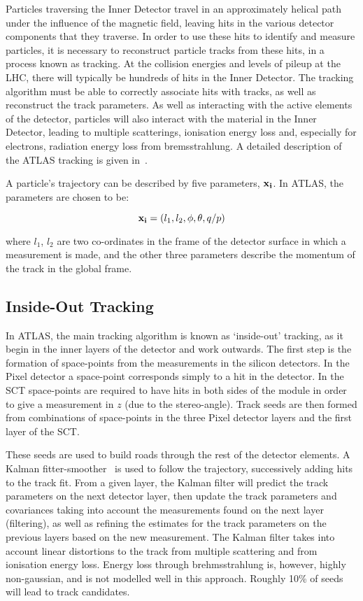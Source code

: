 Particles traversing the Inner Detector travel in an approximately helical path
under the influence of the magnetic field, leaving hits in the various detector
components that they traverse. In order to use these hits to identify and
measure particles, it is necessary to reconstruct particle tracks from these
hits, in a process known as tracking. At the collision energies and levels of
pileup at the LHC, there will typically be hundreds of hits in the Inner
Detector. The tracking algorithm must be able to correctly associate hits with
tracks, as well as reconstruct the track parameters. As well as interacting with
the active elements of the detector, particles will also interact with the
material in the Inner Detector, leading to multiple scatterings, ionisation
energy loss and, especially for electrons, radiation energy loss from
bremsstrahlung. A detailed description of the ATLAS tracking is given
in~\cite{1742-6596-119-3-032014}.

A particle's trajectory can be described by five parameters, $\bf{x_{i}}$. In
ATLAS, the parameters are chosen to be:

\begin{equation} {\bf x_{i}} = (l_{1}, l_{2}, \phi, \theta, q/p) \end{equation}

where $l_{1}$, $l_{2}$ are two co-ordinates in the frame of the detector surface
in which a measurement is made, and the other three parameters describe the momentum of the
track in the global frame.

\subsection{Inside-Out Tracking} \label{sec:tracking-std}

In ATLAS, the main tracking algorithm is known as `inside-out' tracking, as it
begin in the inner layers of the detector and work outwards. The first step is
the formation of space-points from the measurements in the silicon detectors. In
the Pixel detector a space-point corresponds simply to a hit in the detector. In
the SCT space-points are required to have hits in both sides of the module in
order to give a measurement in $z$ (due to the stereo-angle). Track seeds are
then formed from combinations of space-points in the three Pixel detector layers
and the first layer of the SCT. 

These seeds are used to build roads through the rest of the detector elements. A
Kalman fitter-smoother~\cite{Fruhwirth:1987fm} is used to follow the trajectory,
successively adding hits to the track fit. From a given layer, the Kalman filter
will predict the track parameters on the next detector layer, then update the
track parameters and covariances taking into account the measurements found on
the next layer (filtering), as well as refining the estimates for the track
parameters on the previous layers based on the new measurement. The Kalman
filter takes into account linear distortions to the track from multiple
scattering and from ionisation energy loss. Energy loss through brehmsstrahlung
is, however, highly non-gaussian, and is not modelled well in this approach.
Roughly 10\% of seeds will lead to track candidates.

